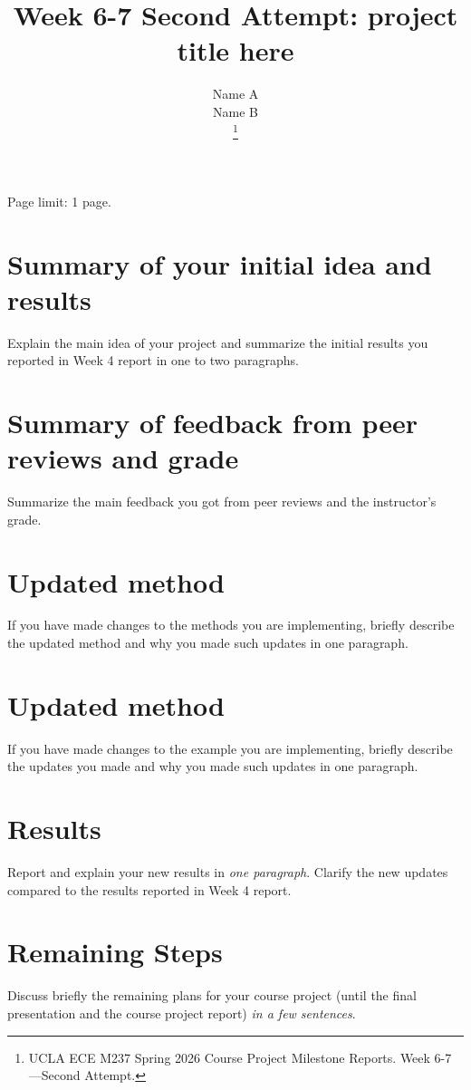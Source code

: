 \documentclass[letterpaper, 10 pt, conference]{ieeeconf}  %
\title{\LARGE \bf
Week 6-7 Second Attempt: project title here}
\author{ \parbox{3 in}{\centering Name A}
        \hspace*{ 0.1 in}
        \parbox{2.5 in}{ \centering Name B}
\thanks{UCLA ECE M237 Spring 2026 Course Project Milestone Reports. Week 6-7---Second Attempt.}
}
\begin{document}
\maketitle

\noindent Page limit: 1 page.

\section{Summary of your initial idea and results}
Explain the main idea of your project and summarize the initial results you reported in Week 4 report in one to two paragraphs.

\section{Summary of feedback from peer reviews and grade}

Summarize the main feedback you got from peer reviews and the instructor's grade.

\section{Updated method}

If you have made changes to the methods you are implementing, briefly describe the updated method and why you made such updates in one paragraph.

\section{Updated method}

If you have made changes to the example you are implementing, briefly describe the updates you made and why you made such updates in one paragraph.

\section{Results}

Report and explain your new results in \textit{one paragraph}. Clarify the new updates compared to the results reported in Week 4 report.

\section{Remaining Steps}

Discuss briefly the remaining plans for your course project (until the final presentation and the course project report) \textit{in a few sentences}.


\end{document}
